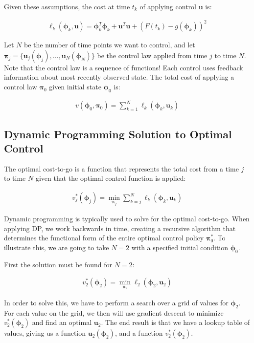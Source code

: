 \documentclass{article} %
\begin{document}
Given these assumptions, the cost at time $t_k$ of applying control $\bm{u}$ is:

\begin{align*}
\ell_k \left( \bm{\phi}_{k}, \bm{u} \right) = \bm{\phi}_{k}^T \bm{\phi}_{k} +
							\bm{u}^T \bm{u} +
							\left( F(t_k) - g(\bm{\phi}_{k}) \right) ^2
\end{align*}

Let $N$ be the number of time points we want to control, and let
$\bm{\pi}_j=\{ \bm{u}_j(\bm{\phi}_{j}), ..., \bm{u}_N(\bm{\phi}_{N}) \}$ be the control
law applied from time $j$ to time $N$. Note that the control law is a sequence of
functions! Each control uses feedback information about most recently observed state.
The total cost of applying a control law $\bm{\pi}_0$ given initial state
$\bm{\phi}_0$ is:

\begin{align*}
v\left( \bm{\phi}_0, \bm{\pi}_0 \right) = \sum_{k=1}^N \ell_k \left( \bm{\phi}_{k}, \bm{u}_k \right)
\end{align*}


\subsection{Dynamic Programming Solution to Optimal Control}

The optimal cost-to-go is a function that represents the total cost from a time
$j$ to time $N$ given that the optimal control function is applied:

\begin{align*}
v^*_j \left( \bm{\phi}_j \right) = \min_{\bm{\pi}_j} \sum_{k=j}^N \ell_k \left( \bm{\phi}_k, \bm{u}_k \right)
\end{align*}

Dynamic programming is typically used to solve for the optimal cost-to-go. When applying
DP, we work backwards in time, creating a recursive algorithm that determines the
functional form of the entire optimal control policy $\bm{\pi}_0^*$. To illustrate
this, we are going to take $N=2$ with a specified initial condition $\bm{\phi}_0$.

First the solution must be found for $N=2$:

\begin{align*}
v^*_2 \left( \bm{\phi}_2 \right) = \min_{\bm{u}_2} \ell_2 \left( \bm{\phi}_2, \bm{u}_2 \right)
\end{align*}

In order to solve this, we have to perform a search over a grid of values for
$\bm{\phi}_2$. For each value on the grid, we then will use gradient descent
to minimize $v^*_2 \left( \bm{\phi}_2 \right)$ and find an optimal $\bm{u}_2$.
The end result is that we have a lookup table of values, giving us a function
$\bm{u}_2(\bm{\phi}_2)$, and a function $v^*_2 \left( \bm{\phi}_2 \right)$.
\end{document}
